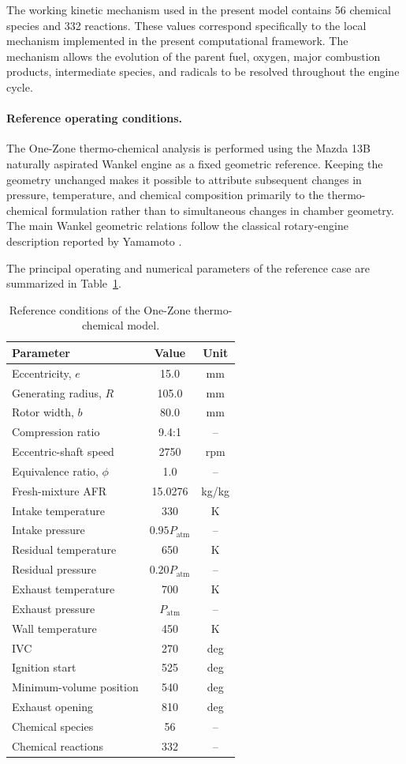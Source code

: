 \documentclass[man,floatsintext,noextraspace]{apa6}
\begin{document}
The working kinetic mechanism used in the present model contains 56 chemical species and 332 reactions. These values correspond specifically to the local mechanism implemented in the present computational framework. The mechanism allows the evolution of the parent fuel, oxygen, major combustion products, intermediate species, and radicals to be resolved throughout the engine cycle.

\paragraph{Reference operating conditions.}

The One-Zone thermo-chemical analysis is performed using the Mazda 13B
naturally aspirated Wankel engine as a fixed geometric reference. Keeping the geometry unchanged makes it possible to attribute subsequent changes in pressure, temperature, and chemical composition primarily to the
thermo-chemical formulation rather than to simultaneous changes in chamber geometry. The main Wankel geometric relations follow the classical rotary-engine description reported by Yamamoto \cite{yamamoto1981}.

The principal operating and numerical parameters of the reference case are summarized in Table~\ref{tab:onezone_conditions}.

\begin{table}[htbp]
\centering
\caption{Reference conditions of the One-Zone thermo-chemical model.}
\label{tab:onezone_conditions}
\begin{tabular}{lcc}
\hline
Parameter & Value & Unit \\
\hline
Eccentricity, $e$ & 15.0 & mm \\
Generating radius, $R$ & 105.0 & mm \\
Rotor width, $b$ & 80.0 & mm \\
Compression ratio & 9.4:1 & -- \\
Eccentric-shaft speed & 2750 & rpm \\
Equivalence ratio, $\phi$ & 1.0 & -- \\
Fresh-mixture AFR & 15.0276 & kg/kg \\
Intake temperature & 330 & K \\
Intake pressure & $0.95P_{\mathrm{atm}}$ & -- \\
Residual temperature & 650 & K \\
Residual pressure & $0.20P_{\mathrm{atm}}$ & -- \\
Exhaust temperature & 700 & K \\
Exhaust pressure & $P_{\mathrm{atm}}$ & -- \\
Wall temperature & 450 & K \\
IVC & 270 & deg \\
Ignition start & 525 & deg \\
Minimum-volume position & 540 & deg \\
Exhaust opening & 810 & deg \\
Chemical species & 56 & -- \\
Chemical reactions & 332 & -- \\
\hline
\end{tabular}
\end{table}
\end{document}
